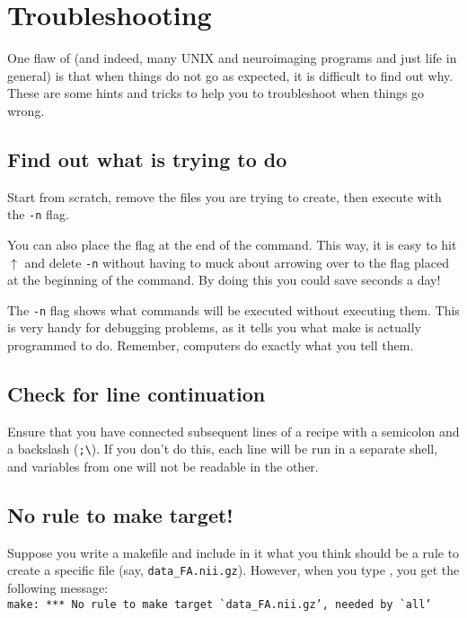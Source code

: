 \section{Troubleshooting \maken}

One flaw of \maken{} (and indeed, many UNIX and neuroimaging programs and just life in general) is that when things do not go as expected, it is difficult to find out why. These are some hints and tricks to help you to troubleshoot when things go wrong.

\subsection{Find out what \maken{} is trying to do}

Start from scratch, remove the files you are trying to create, then execute \maken{} with the \texttt{-n} flag.

You can also place the flag at the end of the command. This way, it is easy to hit $\uparrow$ and delete \texttt{-n} without having to muck about arrowing over to the flag placed at the beginning of the command. By doing this you could save seconds a day!

The \texttt{-n} flag shows what commands will be executed without executing them. This is very handy for debugging problems, as it tells you what make is actually programmed to do. Remember, computers do exactly what you tell them.

\subsection{Check for line continuation}

Ensure that you have connected subsequent lines of a recipe with a semicolon and a backslash (\texttt{;\textbackslash}). If you don't do this, each line will be run in a separate shell, and variables from one will not be readable in the other.

\subsection{No rule to make target!}

Suppose you write a makefile and include in it what you think should be a rule to create a specific file (say, \texttt{data_FA.nii.gz}). However, when you type \maken, you get the following message: \\
\texttt{make: *** No rule to make target \`{}data_FA.nii.gz', needed by \`{}all'}

